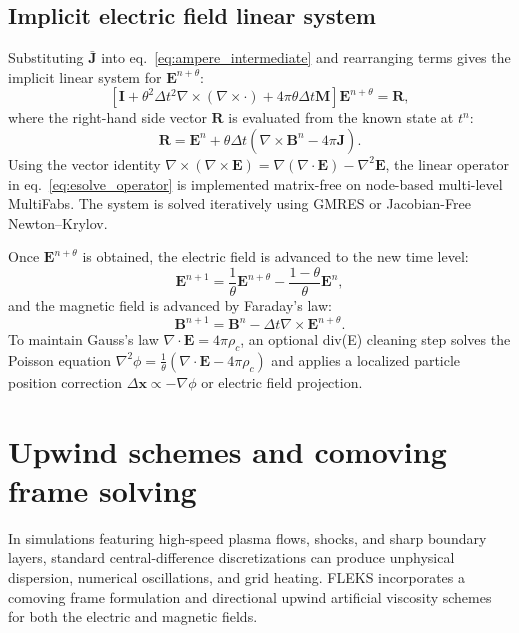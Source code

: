 \documentclass[a4paper, 11pt]{article}
\begin{document}
\subsection{Implicit electric field linear system}

Substituting $\bar{\mathbf{J}}$ into eq.~\eqref{eq:ampere_intermediate} and rearranging terms gives the implicit linear system for $\mathbf{E}^{n+\theta}$:
\begin{equation}
\left[ \mathbf{I} + \theta^2 \Delta t^2 \nabla \times (\nabla \times \cdot) + 4\pi \theta \Delta t \mathbf{M} \right] \mathbf{E}^{n+\theta} = \mathbf{R},
\label{eq:esolve_operator}
\end{equation}
where the right-hand side vector $\mathbf{R}$ is evaluated from the known state at $t^n$:
\begin{equation}
\mathbf{R} = \mathbf{E}^n + \theta \Delta t \left( \nabla \times \mathbf{B}^n - 4\pi \hat{\mathbf{J}} \right).
\end{equation}
Using the vector identity $\nabla \times (\nabla \times \mathbf{E}) = \nabla (\nabla \cdot \mathbf{E}) - \nabla^2 \mathbf{E}$, the linear operator in eq.~\eqref{eq:esolve_operator} is implemented matrix-free on node-based multi-level MultiFabs. The system is solved iteratively using GMRES or Jacobian-Free Newton--Krylov.

Once $\mathbf{E}^{n+\theta}$ is obtained, the electric field is advanced to the new time level:
\begin{equation}
\mathbf{E}^{n+1} = \frac{1}{\theta}\mathbf{E}^{n+\theta} - \frac{1-\theta}{\theta}\mathbf{E}^n,
\end{equation}
and the magnetic field is advanced by Faraday's law:
\begin{equation}
\mathbf{B}^{n+1} = \mathbf{B}^n - \Delta t \nabla \times \mathbf{E}^{n+\theta}.
\end{equation}
To maintain Gauss's law $\nabla \cdot \mathbf{E} = 4\pi \rho_c$, an optional div(E) cleaning step solves the Poisson equation $\nabla^2 \phi = \frac{1}{\theta}(\nabla \cdot \mathbf{E} - 4\pi \rho_c)$ and applies a localized particle position correction $\Delta \mathbf{x} \propto -\nabla \phi$ or electric field projection.

\section{Upwind schemes and comoving frame solving}

In simulations featuring high-speed plasma flows, shocks, and sharp boundary layers, standard central-difference discretizations can produce unphysical dispersion, numerical oscillations, and grid heating. FLEKS incorporates a comoving frame formulation and directional upwind artificial viscosity schemes for both the electric and magnetic fields.
\end{document}
